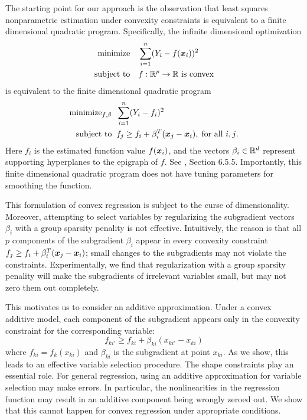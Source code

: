 The starting point for our approach is the observation that least squares
nonparametric estimation under convexity constraints is equivalent to
a finite dimensional quadratic program.  Specifically, the infinite
dimensional optimization 
\begin{align}
\begin{split}
\text{minimize} & \quad \sum_{i=1}^n (Y_i - f(\mbox{\boldmath $x$}_i))^2 \\
\text{subject to} &  \quad f:{\mathbb R}^p\rightarrow{\mathbb R}\ \text{is
  convex}
\end{split}
\end{align}
is equivalent to the finite dimensional quadratic
program 
\begin{align}
\label{eq:convreg}
\begin{split}
\text{minimize}_{f, \beta} & \;\; \sum_{i=1}^n (Y_i - f_i)^2 \\
\text{subject to} & \;\; f_j \geq f_i + \beta_i^T (\mbox{\boldmath $x$}_j-\mbox{\boldmath $x$}_i),\; \text{for
    all $i,j$}.
\end{split}
\end{align}
Here $f_i$ is the estimated function value $f(\mbox{\boldmath $x$}_i)$, and the vectors
$\beta_i \in {\mathbb R}^d$ represent supporting hyperplanes to the
epigraph of $f$.  See \cite{Boyd04}, Section 6.5.5.
Importantly, this finite dimensional quadratic program does
not have tuning parameters for smoothing the function. 

This formulation of convex regression is subject to the curse
of dimensionality.  Moreover, attempting to select variables
by regularizing the subgradient vectors $\beta_i$ with
a group sparsity penality is not effective.  Intuitively, the reason
is that all $p$ components of the subgradient $\beta_i$
appear in every convexity constraint 
$ f_j \geq f_i + \beta_i^T (\mbox{\boldmath $x$}_j-\mbox{\boldmath $x$}_i)$; small changes to the 
subgradients may not violate the constraints.  Experimentally,
we find that regularization with a group sparsity penality
will make the subgradients of irrelevant variables 
small, but may not zero them out completely.

This motivates us to consider an additive approximation. 
Under a convex additive model, each component of the subgradient
appears only in the convexity constraint for
the corresponding variable:
\begin{equation}
f_{ki'} \geq f_{ki} + \beta_{ki}(x_{ki'}-x_{ki}) 
\end{equation}
where $f_{ki} = f_{k}(x_{ki})$ and $\beta_{ki}$ is the
subgradient at point $x_{ki}$.   As we show, this leads to
an effective variable selection procedure.  The
shape constraints play an essential role.
For general regression, using an additive approximation for variable
selection may make errors.  In particular, the nonlinearities in the
regression function may result in an additive component being wrongly
zeroed out.  We show that this cannot happen for convex regression
under appropriate conditions.

